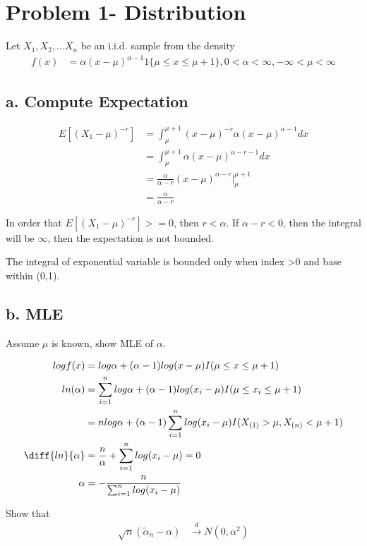 	
\section{Problem 1- Distribution}
	Let $X_1, X_2,... X_n$ be an i.i.d. sample from the density
	\begin{align*}
		f(x) &= \alpha(x-\mu)^{\alpha-1} 1\{ \mu \leq x \leq \mu+1\}, 0< \alpha < \infty, -\infty < \mu < \infty
	\end{align*}	
	
\subsection{a. Compute Expectation}

	\begin{align*}
		E[(X_1- \mu)^{-r}] &= \int_{\mu}^{\mu+1} (x-\mu)^{-r} \alpha (x-\mu)^{\alpha-1} dx \\
		&= \int_{\mu}^{\mu+1} \alpha (x-\mu)^{\alpha-r-1} dx \\
		&= \frac{\alpha}{\alpha -r} (x-\mu)^{\alpha-r} \Bigg |_{\mu}^{\mu+1}\\
		&=  \frac{\alpha}{\alpha -r} 
	\end{align*}	

In order that $E[(X_1- \mu)^{-r}] >= 0$, then $r < \alpha$. If $\alpha -r < 0$, then the integral will be $
\infty$, then the expectation is not bounded.

The integral of exponential variable is bounded only when index >0 and base within (0,1).

\subsection{b. MLE}
Assume $\mu$ is known, show MLE of $\alpha$.

	\begin{align*}
		log f(x)&= log \alpha + (\alpha -1) log(x-\mu) I(\mu \leq x \leq \mu+1)\\
		ln(\alpha) &= \sum_{i=1}^n log \alpha + (\alpha -1) log(x_i-\mu) I(\mu \leq x_i \leq \mu+1) \\
		&= n log \alpha +  (\alpha -1) \sum_{i=1}^n log (x_i - \mu) I(X_{(1)} > \mu, X_{(n)} < \mu+1)\\
		\diff{ln}{\alpha}&= \frac{n}{\alpha } +\sum_{i=1}^n log (x_i - \mu) =0 \\
		\alpha &= - \frac{n}{\sum_{i=1}^n log (x_i - \mu)} 
	\end{align*}
	
	Show that 
	\begin{align*}
		\sqrt{n} (\tilde{\alpha}_n - \alpha)& \xrightarrow{d} N(0, \alpha^2)\\
	\end{align*}
	
